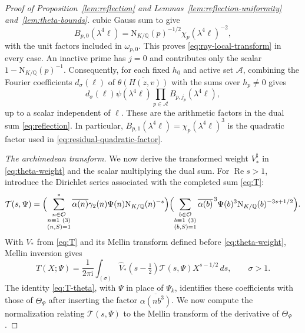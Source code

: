 \documentclass[11pt,a4paper]{article}
\numberwithin{equation}{section}
\numberwithin{figure}{section}
\theoremstyle{definition}
\theoremstyle{remark}
\newcommand{\Q}{\mathbb Q}
\newcommand{\NK}{\mathrm N_{K/\Q}}
\newcommand{\OO}{\mathcal O}
\newcommand{\Rea}{\operatorname{Re}}
\newcommand{\dd}{\,d}
\begin{document}
\begin{proof}[Proof of Proposition~\ref{lem:reflection} and Lemmas~\ref{lem:reflection-uniformity} and~\ref{lem:theta-bounds}]
cubic Gauss sum to give
\[
 B_{p,0}(\lambda^4\ell)
 =\NK(p)^{-1/2}\chi_p(\lambda^4\ell)^{-2},
\]
with the unit factors included in $\omega_{p,0}$. This proves
\eqref{eq:ray-local-transform} in every case. An inactive
prime has $j=0$ and contributes only the scalar $1-\NK(p)^{-1}$.
Consequently, for each fixed $h_0$ and active set $\mathcal A$,
combining the Fourier coefficients $d_\sigma(\ell)$ of
$\overline{\theta(H(z,v))}$ with the sums over $h_p\ne0$ gives
\[
 d_\sigma(\ell)\psi(\lambda^4\ell)
 \prod_{p\in\mathcal A}B_{p,j_p}(\lambda^4\ell),
\]
up to a scalar independent of $\ell$. These are the arithmetic
factors in the dual sum \eqref{eq:reflection}. In particular,
$B_{p,1}(\lambda^4\ell)=\chi_p(\lambda^4\ell)^3$ is the quadratic
factor used in \eqref{eq:residual-quadratic-factor}.

\noindent\textit{The archimedean transform.}\quad
We now derive the transformed weight $V_*^\sharp$ in
\eqref{eq:theta-weight} and the scalar multiplying the dual sum. For $\Rea s>1$, introduce the Dirichlet series
associated with the completed sum \eqref{eq:T}:
\[
 \mathcal T(s,\Psi)=
 \Bigl(\sum_{\substack{n\in\OO\\n\equiv1\ (3)\\(n,S)=1}}^*
   \overline{\alpha(n)}\gamma_2(n)\Psi(n)\NK(n)^{-s}\Bigr) \Bigl(\sum_{\substack{b\in\OO\\b\equiv1\ (3)\\(b,S)=1}}\overline{\alpha(b)}^{\,3}
   \Psi(b)^3\NK(b)^{-3s+1/2}\Bigr).
\]
With $V_*$ from \eqref{eq:T} and its Mellin transform defined
before \eqref{eq:theta-weight}, Mellin inversion gives
\begin{equation}\label{eq:theta-mellin-inversion}
 T(X;\Psi)=\frac1{2\pi \mathrm i}\int_{(\sigma)}
 \widehat V_*(s-\tfrac12)\mathcal T(s,\Psi)X^{s-1/2}\dd s,
 \qquad \sigma>1.
\end{equation}
The identity \eqref{eq:T-theta}, with $\Psi$ in place of $\Psi_k$,
identifies these coefficients with those of $\Theta_\Psi$ after
inserting the factor $\overline{\alpha(nb^3)}$. We now compute the
normalization relating $\mathcal T(s,\Psi)$ to the Mellin transform
of the derivative of $\Theta_\Psi$.


\end{proof}
\end{document}
